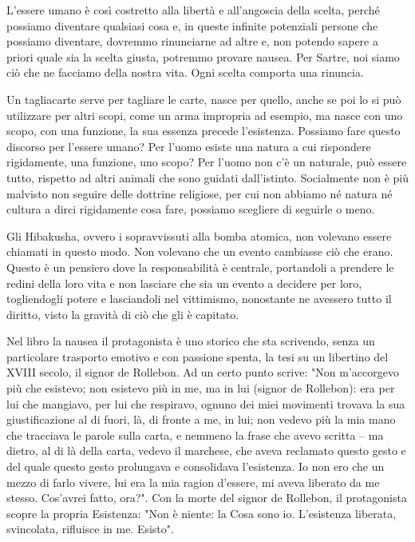 \documentclass[12pt]{book} %
\begin{document}
L'essere umano è così costretto alla libertà e all'angoscia
della scelta, perché possiamo diventare qualsiasi cosa e, in queste infinite potenziali persone che possiamo diventare, dovremmo rinunciarne ad altre e, non potendo sapere a priori quale sia la scelta giusta, potremmo provare nausea. Per
Sartre, noi siamo ciò che ne facciamo della nostra vita. 
Ogni scelta comporta una rinuncia. 

Un tagliacarte serve per tagliare le carte, nasce per quello, anche se poi lo si può utilizzare per altri scopi, come un
arma impropria ad esempio, ma nasce con uno scopo, con una funzione, la sua essenza precede l'esistenza. Possiamo fare
questo discorso per l'essere umano? Per l'uomo esiste una natura a cui rispondere rigidamente, una funzione, uno scopo?
Per l'uomo non c'è un naturale, può essere tutto, rispetto ad altri animali che sono
guidati dall'istinto. Socialmente non è più malvisto non seguire delle dottrine religiose, per cui non abbiamo né
natura né cultura a dirci rigidamente cosa fare, possiamo scegliere di seguirle o meno. 

Gli Hibakusha, ovvero i sopravvissuti alla bomba atomica, non volevano essere chiamati in questo modo. Non volevano che
un evento cambiasse ciò che erano. Questo è un pensiero dove la responsabilità è centrale, portandoli a prendere le
redini della loro vita e non lasciare che sia un evento a decidere per loro, togliendogli potere e lasciandoli nel
vittimismo, nonostante ne avessero tutto il diritto, visto la gravità di ciò che gli è capitato. 

Nel libro la nausea il protagonista è uno storico che sta scrivendo,
senza un particolare trasporto emotivo e con passione spenta, la tesi su un libertino del XVIII secolo, il signor de
Rollebon. Ad un certo punto scrive: "Non m'accorgevo più che esistevo; non
esistevo più in me, ma in lui (signor de Rollebon): era per lui che mangiavo, per lui che respiravo, ognuno dei miei
movimenti trovava la sua giustificazione al di fuori, là, di fronte a me, in lui; non vedevo più la mia mano che
tracciava le parole sulla carta, e nemmeno la frase che avevo scritta – ma dietro, al di là della carta, vedevo il
marchese, che aveva reclamato questo gesto e del quale questo gesto prolungava e consolidava
l'esistenza. Io non ero che un mezzo di farlo vivere, lui era la mia ragion
d'essere, mi aveva liberato da me stesso. Cos'avrei fatto,
ora?". Con la morte del signor de Rollebon, il protagonista scopre la propria Esistenza:
"Non è niente: la Cosa sono io. L'esistenza liberata, svincolata, rifluisce
in me. Esisto". 
\end{document}
